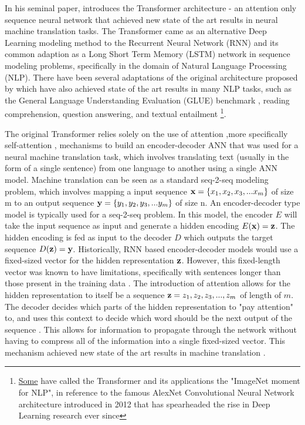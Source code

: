 In his seminal paper, \citet{vaswani2017attention} introduces the Transformer architecture - an attention only sequence neural network that achieved new state of the art results in neural machine translation tasks. The Transformer came as an alternative Deep Learning modeling method to the Recurrent Neural Network (RNN) and its common adaption as a Long Short Term Memory (LSTM) network in sequence modeling problems, specifically in the domain of Natural Language Processing (NLP). There have been several adaptations of the original architecture proposed by \citet{vaswani2017attention} which have also achieved state of the art results in many NLP tasks, such as the General Language Understanding Evaluation (GLUE) benchmark \cite{devlin2018bert}\cite{wang2018glue}, reading comprehension, question answering, and textual entailment \cite{brown2020language} \footnote{\href{https://ruder.io/nlp-imagenet/}{Some} have called the Transformer and its applications the "ImageNet moment for NLP", in reference to the famous AlexNet Convolutional Neural Network architecture introduced in 2012 \cite{krizhevsky2017imagenet} that has spearheaded the rise in Deep Learning research ever since}. 


The original Transformer relies solely on the use of attention \cite{bahdanau2014neural},more specifically self-attention , mechanisms to build an encoder-decoder ANN that was used for a neural machine translation task, which involves translating text (usually in the form of a single sentence) from one language to another using a single ANN model. Machine translation can be seen as a standard seq-2-seq modeling problem, which involves mapping a input sequence $\mathbf{x} = \{x_1, x_2, x_3,...x_m\}$ of size m to an output sequence $\mathbf{y} = \{y_1, y_2, y_3, ... y_m\}$ of size n. An encoder-decoder type model is typically used for a seq-2-seq problem. In this model, the encoder $E$ will take the input sequence as input and generate a hidden encoding $E(\mathbf{x}) = \mathbf{z}$. The hidden encoding is fed as input to the decoder $D$ which outputs the target sequence $D(\mathbf{z}) = \mathbf{y}$. Historically, RNN based encoder-decoder models would use a fixed-sized vector for the hidden representation $\mathbf{z}$. However, this fixed-length vector was known to have limitations, specifically with sentences longer than those present in the training data \cite{bahdanau2014neural}. The introduction of attention allows for the hidden representation to itself be a sequence $\mathbf{z} = {z_1, z_2, z_3, ..., z_m}$ of length of $m$. The decoder decides which parts of the hidden representation to "pay attention" to, and uses this context to decide which word should be the next output of the sequence \cite{bahdanau2014neural}. This allows for information to propagate through the network without having to compress all of the information into a single fixed-sized vector. This mechanism achieved new state of the art results in machine translation  . 

